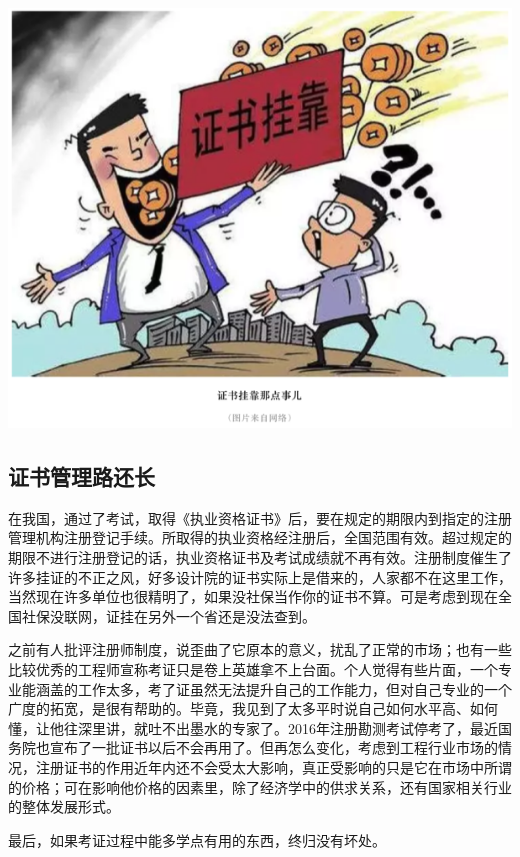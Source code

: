 \documentclass[
]{book}
\begin{document}
\includegraphics[width=8.33in]{images/kaozheng5}

\hypertarget{ux8bc1ux4e66ux7ba1ux7406ux8defux8fd8ux957f}{%
\subsection{证书管理路还长}\label{ux8bc1ux4e66ux7ba1ux7406ux8defux8fd8ux957f}}

在我国，通过了考试，取得《执业资格证书》后，要在规定的期限内到指定的注册管理机构注册登记手续。所取得的执业资格经注册后，全国范围有效。超过规定的期限不进行注册登记的话，执业资格证书及考试成绩就不再有效。注册制度催生了许多挂证的不正之风，好多设计院的证书实际上是借来的，人家都不在这里工作，当然现在许多单位也很精明了，如果没社保当作你的证书不算。可是考虑到现在全国社保没联网，证挂在另外一个省还是没法查到。

之前有人批评注册师制度，说歪曲了它原本的意义，扰乱了正常的市场；也有一些比较优秀的工程师宣称考证只是卷上英雄拿不上台面。个人觉得有些片面，一个专业能涵盖的工作太多，考了证虽然无法提升自己的工作能力，但对自己专业的一个广度的拓宽，是很有帮助的。毕竟，我见到了太多平时说自己如何水平高、如何懂，让他往深里讲，就吐不出墨水的专家了。2016年注册勘测考试停考了，最近国务院也宣布了一批证书以后不会再用了。但再怎么变化，考虑到工程行业市场的情况，注册证书的作用近年内还不会受太大影响，真正受影响的只是它在市场中所谓的价格；可在影响他价格的因素里，除了经济学中的供求关系，还有国家相关行业的整体发展形式。

最后，如果考证过程中能多学点有用的东西，终归没有坏处。
\end{document}
